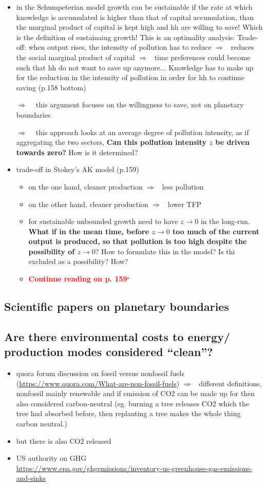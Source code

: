 \documentclass[12pt]{article}
\newcommand{\ar}{$\Rightarrow$ \ }
\newcommand{\tr}[1]{\textcolor{red}{#1}}
\begin{document}
\begin{itemize}
\begin{itemize}
\item in the Schumpeterian model growth can be sustainable if the rate at which knowledge is accumulated is higher than that of capital accumulation, than the marginal product of capital is kept high and hh are willing to save! Which is the definition of sustainaing growth!
This is an optimality analysis: Trade-off: when output rises, the intensity of pollution has to reduce \ar reduces the social marginal product of capital \ar time preferences could become such that hh do not want to save up anymore... 
Knowledge has to make up for the reduction in the intensity of pollution in order for hh to continue saving (p.158 bottom)
\item[\ar] this argument focuses on the willingness to save, not on planetary boundaries
\item[\ar] this approach looks at an average degree of pollution intensity, as if aggregating the two sectors, \textbf{Can this pollution intensity $z$ be driven towards zero?} How is it determined? 
\item trade-off in Stokey's AK model (p.159)
\begin{itemize}
\item on the one hand, cleaner production \ar less pollution
\item on the other hand, cleaner production \ar lower TFP
\item for sustainable unbounded growth need to have $z\rightarrow0$ in the long-run. \textbf{What if in the mean time, before $z\rightarrow0$ too much of the current output is produced,  so that pollution is too high despite the possibility of $z\rightarrow0$}? How to formulate this in the model? Is thi excluded as a possibility? How?
\item \tr{\textbf{Continue reading on p. 159`}}
\end{itemize}
\end{itemize}
\end{itemize}

\subsection{Scientific papers on planetary boundaries}

\subsection{Are there environmental costs to energy/ production modes considered ``clean''?}
\begin{itemize}
\item quora forum discussion on fossil versus nonfossil fuels (\url{https://www.quora.com/What-are-non-fossil-fuels}) \ar different definitions, nonfossil mainly renewable and if emission of CO2 can be made up for then also considered carbon-neutral (eg. burning a tree releases CO2 which the tree had absorbed before, then replanting a tree makes the whole thing carbon neutral.)
\item but there is also CO2 released
\item US authority on GHG \\ \url{https://www.epa.gov/ghgemissions/inventory-us-greenhouse-gas-emissions-and-sinks}
\end{itemize}
\end{document}
